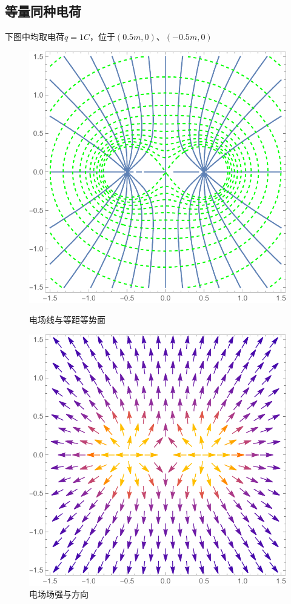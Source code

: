 \subsection{等量同种电荷}

下图中均取电荷$q=1C$，位于$(0.5m,0)$、$(-0.5m,0)$

\begin{figure}[H]
\begin{minipage}[b]{0.4\linewidth}
\centering
\includegraphics[width=\textwidth]{pic_data/T/dltzdh_p1.pdf}
\caption{电场线与等距等势面}
\end{minipage}
\hfill
\begin{minipage}[b]{0.4\linewidth}
\centering
\includegraphics[width=\textwidth]{pic_data/T/dltzdh_p2.pdf}
\caption{电场场强与方向\protect \footnotemark}
\end{minipage}
\end{figure}

